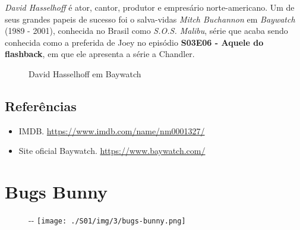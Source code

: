 \emph{David Hasselhoff} é ator, cantor, produtor e empresário
norte-americano. Um de seus grandes papeis de sucesso foi o salva-vidas
\emph{Mitch Buchannon} em \emph{Baywatch} (1989 - 2001), conhecida no
Brasil como \emph{S.O.S. Malibu}, série que acaba sendo conhecida como a
preferida de Joey no episódio
\textbf{\textcolor{primarycolor}{S03E06 - Aquele do flashback}}, em que
ele apresenta a série a Chandler.

\begin{figure}
  \centering
    \caption{David Hasselhoff em Baywatch\label{fig:david-hasselhoff-em-baywatch}}
\end{figure}

\hypertarget{referuxeancias-3}{%
\subsection{Referências}\label{referuxeancias-3}}

\begin{itemize}
\tightlist
\item
  \sloppy IMDB. \url{https://www.imdb.com/name/nm0001327/}
\item
  \sloppy Site oficial Baywatch. \url{https://www.baywatch.com/}
\end{itemize}

\hypertarget{bugs-bunny}{%
\section{Bugs Bunny}\label{bugs-bunny}}

\begin{figure}[!ht]
  \begin{adjustwidth}{-\oddsidemargin-1in}{-\rightmargin}
    \centering
    \texttt{[image: ./S01/img/3/bugs-bunny.png]}
  \end{adjustwidth}
\end{figure}

